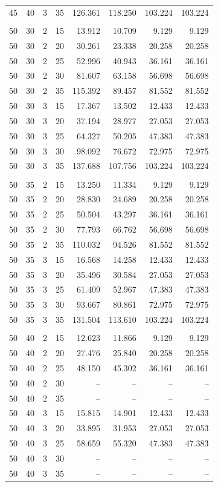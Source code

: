 \documentclass{article}
\begin{document}
\begin{longtable}{rrrrrrrr}
45 & 40 & 3 & 35 & 126.361 & 118.250 & 103.224 & 103.224 \\
\addlinespace
\multicolumn{8}{l}{\textbf{$\theta_1=50^\circ$, $\theta_2=30^\circ$}} \\
50 & 30 & 2 & 15 & 13.912 & 10.709 & 9.129 & 9.129 \\
50 & 30 & 2 & 20 & 30.261 & 23.338 & 20.258 & 20.258 \\
50 & 30 & 2 & 25 & 52.996 & 40.943 & 36.161 & 36.161 \\
50 & 30 & 2 & 30 & 81.607 & 63.158 & 56.698 & 56.698 \\
50 & 30 & 2 & 35 & 115.392 & 89.457 & 81.552 & 81.552 \\
50 & 30 & 3 & 15 & 17.367 & 13.502 & 12.433 & 12.433 \\
50 & 30 & 3 & 20 & 37.194 & 28.977 & 27.053 & 27.053 \\
50 & 30 & 3 & 25 & 64.327 & 50.205 & 47.383 & 47.383 \\
50 & 30 & 3 & 30 & 98.092 & 76.672 & 72.975 & 72.975 \\
50 & 30 & 3 & 35 & 137.688 & 107.756 & 103.224 & 103.224 \\
\addlinespace
\multicolumn{8}{l}{\textbf{$\theta_1=50^\circ$, $\theta_2=35^\circ$}} \\
50 & 35 & 2 & 15 & 13.250 & 11.334 & 9.129 & 9.129 \\
50 & 35 & 2 & 20 & 28.830 & 24.689 & 20.258 & 20.258 \\
50 & 35 & 2 & 25 & 50.504 & 43.297 & 36.161 & 36.161 \\
50 & 35 & 2 & 30 & 77.793 & 66.762 & 56.698 & 56.698 \\
50 & 35 & 2 & 35 & 110.032 & 94.526 & 81.552 & 81.552 \\
50 & 35 & 3 & 15 & 16.568 & 14.258 & 12.433 & 12.433 \\
50 & 35 & 3 & 20 & 35.496 & 30.584 & 27.053 & 27.053 \\
50 & 35 & 3 & 25 & 61.409 & 52.967 & 47.383 & 47.383 \\
50 & 35 & 3 & 30 & 93.667 & 80.861 & 72.975 & 72.975 \\
50 & 35 & 3 & 35 & 131.504 & 113.610 & 103.224 & 103.224 \\
\addlinespace
\multicolumn{8}{l}{\textbf{$\theta_1=50^\circ$, $\theta_2=40^\circ$}} \\
50 & 40 & 2 & 15 & 12.623 & 11.866 & 9.129 & 9.129 \\
50 & 40 & 2 & 20 & 27.476 & 25.840 & 20.258 & 20.258 \\
50 & 40 & 2 & 25 & 48.150 & 45.302 & 36.161 & 36.161 \\
50 & 40 & 2 & 30 & -- & -- & -- & -- \\
50 & 40 & 2 & 35 & -- & -- & -- & -- \\
50 & 40 & 3 & 15 & 15.815 & 14.901 & 12.433 & 12.433 \\
50 & 40 & 3 & 20 & 33.895 & 31.953 & 27.053 & 27.053 \\
50 & 40 & 3 & 25 & 58.659 & 55.320 & 47.383 & 47.383 \\
50 & 40 & 3 & 30 & -- & -- & -- & -- \\
50 & 40 & 3 & 35 & -- & -- & -- & -- \\
\end{longtable}
\end{document}
